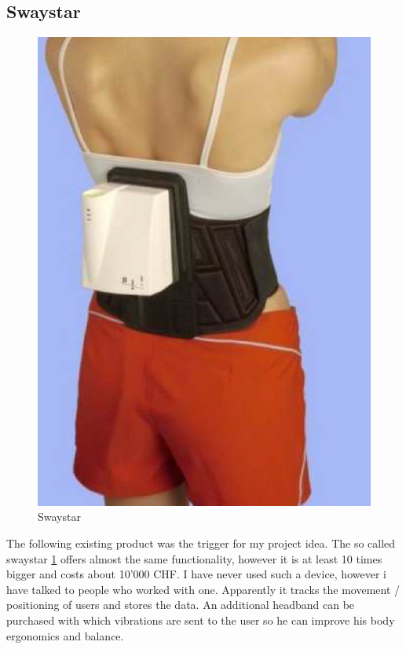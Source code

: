\subsection{Swaystar}

\begin{figure}
  \begin{center}
\includegraphics[width=\linewidth]{images/Swaystar_01.png}
  \end{center}
  \caption{\label{fig:swaystar}Swaystar}
\end{figure}

The following existing product was the trigger for my project idea. The so called swaystar \ref{fig:swaystar} offers almost the same functionality, however it is at least 10 times bigger and costs about 10'000 CHF. 
I have never used such a device, however i have talked to people who worked with one. Apparently it tracks the movement / positioning of users and stores the data. An additional headband can be purchased with which vibrations are sent to the user so he can improve his body ergonomics and balance. 

